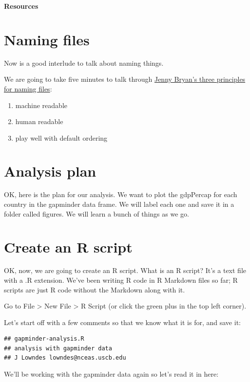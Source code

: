 \documentclass[]{book}
\providecommand{\tightlist}{%
  \setlength{\itemsep}{0pt}\setlength{\parskip}{0pt}}
\theoremstyle{definition}
\theoremstyle{definition}
\theoremstyle{definition}
\theoremstyle{remark}
\begin{document}
\textbf{Resources}

\section{Naming files}\label{naming-files}

Now is a good interlude to talk about naming things.

We are going to take five minutes to talk through
\href{https://speakerdeck.com/jennybc/how-to-name-files}{Jenny Bryan's
three principles for naming files}:

\begin{enumerate}
\def\labelenumi{\arabic{enumi}.}
\tightlist
\item
  machine readable
\item
  human readable
\item
  play well with default ordering
\end{enumerate}

\section{Analysis plan}\label{analysis-plan}

OK, here is the plan for our analysis. We want to plot the gdpPercap for
each country in the gapminder data frame. We will label each one and
save it in a folder called figures. We will learn a bunch of things as
we go.

\section{Create an R script}\label{create-an-r-script}

OK, now, we are going to create an R script. What is an R script? It's a
text file with a .R extension. We've been writing R code in R Markdown
files so far; R scripts are just R code without the Markdown along with
it.

Go to File \textgreater{} New File \textgreater{} R Script (or click the
green plus in the top left corner).

Let's start off with a few comments so that we know what it is for, and
save it:

\begin{verbatim}
## gapminder-analysis.R
## analysis with gapminder data
## J Lowndes lowndes@nceas.uscb.edu
\end{verbatim}

We'll be working with the gapminder data again so let's read it in here:
\end{document}
